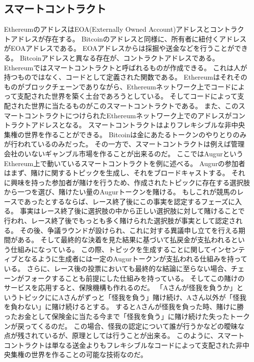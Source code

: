 \subsection{スマートコントラクト}
EthereumのアドレスはEOA(Externally Owned Account)アドレスとコントラクトアドレスが存在する。
Bitcoinのアドレスと同様に、所有者に紐付くアドレスがEOAアドレスである。
EOAアドレスからは採掘や送金などを行うことができる。
Bitcoinアドレスと異なる存在が、コントラクトアドレスである。
Ethereumではスマートコントラクトと呼ばれるものが作成できる。
これは人が持つものではなく、コードとして定義された関数である。
Ethereumはそれそのものがブロックチェーンでありながら、Ethereumネットワーク上でコードによって支配された世界を築く土台であろうとしている。
そしてコードによって支配された世界に当たるものがこのスマートコントラクトである。
また、このスマートコントラクトにつけられたEthereumネットワーク上でのアドレスがコントラクトアドレスとなる。
スマートコントラクトはよりフレキシブルな非中央集権の世界を作ることができる。
Bitcoinは金にあたるトークンのやりとりのみが行われているのみだった。
その一方で、スマートコントラクトは例えば管理会社のいないギャンブル市場を作ることが出来るのだ。
ここではAugurというEthereum上で動いているスマートコントラクトを例に述べる。
Augurの参加者はまず、賭けに関するトピックを生成し、それをブロードキャストする。
それに興味を持った参加者が賭けを行うため、作成されたトピックに存在する選択肢から一つを選び、賭けたい量のAugurトークンを賭ける。
もしこれが競馬のレースであったとするならば、レース終了後にこの事実を認定するフェーズに入る。
事実はレース終了後に選択肢の中から正しい選択肢に対して賭けることで行われ、レース終了後でもっとも多く賭けられた選択肢が事実として認定される。
その後、争議ラウンドが設けられ、これに対する異議申し立てを行える期間がある。
そして最終的な決着を見た結果に基づいて払戻金が支払われるという仕組みになっている。
この際、トピックを生成することに関してインセンティブとなるように生成者には一定のAugurトークンが支払われる仕組みを持っている。
さらに、レース後の投票においても最終的な結論に至らない場合、チェーンがフォークすることも前提にした仕組みを持っている。
そしてこの賭けのサービスを応用すると、保険機構も作れるのだ。
「Aさんが怪我を負うか」というトピックににAさんがずっと「怪我を負う」賭け続け、Aさん以外が「怪我を負わない」に賭け続けるとする。
するとAさんが怪我を負った時、賭けに勝ったお金として保険金に当たる今まで「怪我を負う」に賭け続けた失ったトークンが戻ってくるのだ。
この場合、怪我の認定について誰が行うかなどの曖昧な点が残されているが、原理としては行うことが出来る。
このように、スマートコントラクトは単なる送金よりもフレキシブルなコードによって支配された非中央集権の世界を作ることの可能な技術なのだ。


